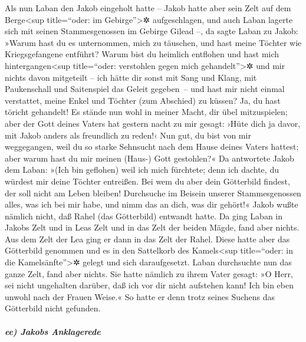  Als nun Laban den Jakob eingeholt hatte -- Jakob hatte
aber sein Zelt auf dem Berge\textless sup title=``oder: im
Gebirge''\textgreater✲ aufgeschlagen, und auch Laban lagerte sich mit
seinen Stammesgenossen im Gebirge Gilead --,  da sagte
Laban zu Jakob: »Warum hast du es unternommen, mich zu täuschen, und
hast meine Töchter wie Kriegsgefangene entführt?  Warum
bist du heimlich entflohen und hast mich hintergangen\textless sup
title=``oder: verstohlen gegen mich gehandelt''\textgreater✲ und mir
nichts davon mitgeteilt -- ich hätte dir sonst mit Sang und Klang, mit
Paukenschall und Saitenspiel das Geleit gegeben~--  und
hast mir nicht einmal verstattet, meine Enkel und Töchter (zum Abschied)
zu küssen? Ja, du hast töricht gehandelt!  Es stände nun
wohl in meiner Macht, dir übel mitzuspielen; aber der Gott deines Vaters
hat gestern nacht zu mir gesagt: ›Hüte dich ja davor, mit Jakob anders
als freundlich zu reden!‹  Nun gut, du bist von mir
weggegangen, weil du so starke Sehnsucht nach dem Hause deines Vaters
hattest; aber warum hast du mir meinen (Haus-) Gott gestohlen?«
 Da antwortete Jakob dem Laban: »(Ich bin geflohen) weil
ich mich fürchtete; denn ich dachte, du würdest mir deine Töchter
entreißen.  Bei wem du aber dein Götterbild findest, der
soll nicht am Leben bleiben! Durchsuche im Beisein unserer
Stammesgenossen alles, was ich bei mir habe, und nimm das an dich, was
dir gehört!« Jakob wußte nämlich nicht, daß Rahel (das Götterbild)
entwandt hatte.  Da ging Laban in Jakobs Zelt und in Leas
Zelt und in das Zelt der beiden Mägde, fand aber nichts. Aus dem Zelt
der Lea ging er dann in das Zelt der Rahel.  Diese hatte
aber das Götterbild genommen und es in den Sattelkorb des
Kamels\textless sup title=``oder: in die Kamelsänfte''\textgreater✲
gelegt und sich daraufgesetzt. Laban durchsuchte nun das ganze Zelt,
fand aber nichts.  Sie hatte nämlich zu ihrem Vater
gesagt: »O Herr, sei nicht ungehalten darüber, daß ich vor dir nicht
aufstehen kann! Ich bin eben unwohl nach der Frauen Weise.« So hatte er
denn trotz seines Suchens das Götterbild nicht gefunden.

\hypertarget{ee-jakobs-anklagerede}{%
\subparagraph{ee) Jakobs Anklagerede}\label{ee-jakobs-anklagerede}}

